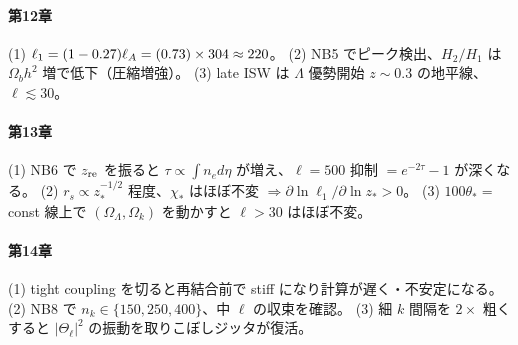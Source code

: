 \paragraph{第12章}
(1) $\ell_1=(1-0.27)\ell_A=(0.73)\times304\approx220$。
(2) NB5 でピーク検出、$H_2/H_1$ は $\Omega_bh^2$ 増で低下（圧縮増強）。
(3) late ISW は $\Lambda$ 優勢開始 $z\sim0.3$ の地平線、$\ell\lesssim30$。

\paragraph{第13章}
(1) NB6 で $z_{\rm re}$ を振ると $\tau\propto\int n_e d\eta$ が増え、$\ell=500$ 抑制
$=e^{-2\tau}-1$ が深くなる。
(2) $r_s\propto z_*^{-1/2}$ 程度、$\chi_*$ はほぼ不変 $\Rightarrow\partial\ln\ell_1/\partial\ln z_*>0$。
(3) $100\theta_*=$const 線上で $(\Omega_\Lambda,\Omega_k)$ を動かすと $\ell>30$ はほぼ不変。

\paragraph{第14章}
(1) tight coupling を切ると再結合前で stiff になり計算が遅く・不安定になる。
(2) NB8 で $n_k\in\{150,250,400\}$、中 $\ell$ の収束を確認。
(3) 細 $k$ 間隔を $2\times$ 粗くすると $|\Theta_\ell|^2$ の振動を取りこぼしジッタが復活。
